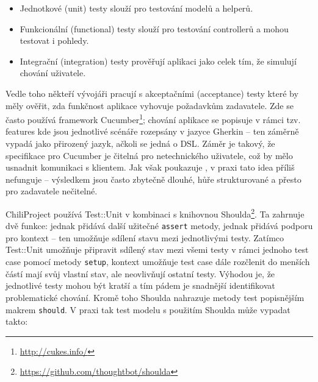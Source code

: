 \documentclass[thesis=B,czech]{FITthesis}[2012/05/02]
\begin{document}
\begin{itemize}
\item
  Jednotkové (unit) testy slouží pro testování modelů a helperů.
\item
  Funkcionální (functional) testy slouží pro testování controllerů a
  mohou testovat i pohledy.
\item
  Integrační (integration) testy prověřují aplikaci jako celek tím, že
  simulují chování uživatele.
\end{itemize}
Vedle toho někteří vývojáři pracují s akceptačními (acceptance) testy
které by měly ověřit, zda funkčnost aplikace vyhovuje požadavkům
zadavatele. Zde se často používá framework Cucumber\footnote{\url{http://cukes.info/}};
chování aplikace se popisuje v rámci tzv. features kde jsou jednotlivé
scénáře rozepsány v jazyce Gherkin -- ten záměrně vypadá jako přirozený
jazyk, ačkoli se jedná o \gls{DSL}. Záměr je takový, že specifikace pro
Cucumber je čitelná pro netechnického uživatele, což by mělo usnadnit
komunikaci s klientem. Jak však poukazuje \citep{Kinsella2011}, v praxi
tato idea příliš nefunguje -- výsledkem jsou často  zbytečně dlouhé, hůře strukturované a přesto pro
zadavatele nečitelné.

ChiliProject používá Test::Unit v kombinaci s knihovnou
Shoulda\footnote{\url{https://github.com/thoughtbot/shoulda}}. Ta
zahrnuje dvě funkce: jednak přidává další užitečné \lstinline!assert!
metody, jednak přidává podporu pro kontext -- ten umožňuje sdílení stavu
mezi jednotlivými testy. Zatímco Test::Unit umožňuje připravit sdílený
stav mezi všemi testy v rámci jednoho test case pomocí metody
\lstinline!setup!, kontext umožňuje test case dále rozčlenit do menších
částí mají svůj vlastní stav, ale neovlivňují ostatní testy. Výhodou je,
že jednotlivé testy mohou být kratší a tím pádem je snadnější
identifikovat problematické chování. Kromě toho Shoulda nahrazuje metody
test popisnějším makrem \lstinline!should!. V praxi tak test modelu s
použitím Shoulda může vypadat takto:
\end{document}
